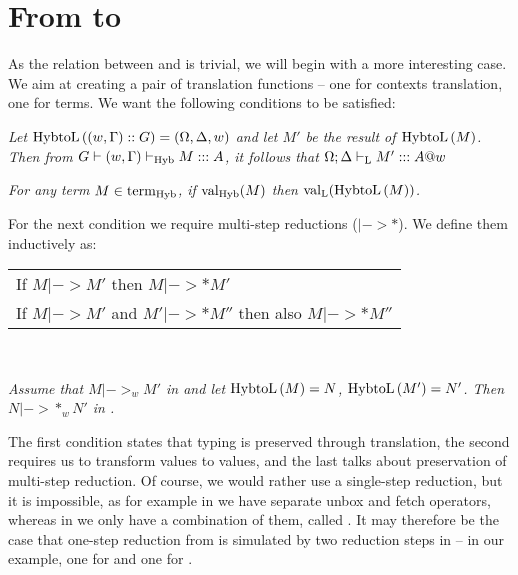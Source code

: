\section{From \langHyb{} to \langL{}}
As the relation between \langHyb{} and \langLF{} is trivial, we will begin with a more interesting case. We aim at creating a pair of translation functions \funHybtoLe{} -- one for contexts translation, one for terms. We want the following conditions to be satisfied:

\begin{introtheoremB} \em
Let $\funHybtoL{(w, \Gamma) :: G} = (\Omega, \Delta, w)$  and let $M'$ be the result of $\funHybtoL{M}$. 
Then from $G |- (w, \Gamma) |-_\tHyb{} M ::: A$, it follows that $\Omega; \Delta |-_\tL M' ::: A @ w$
\end{introtheoremB}

\begin{introtheoremB}\em
For any term $M \in \teHyb{}$, if $\val[\tHyb]{M}$ then $\val[\tL]{\funHybtoL{M}}$.
\end{introtheoremB}

For the next condition we require multi-step reductions ($|->*$). We define them inductively as:\\

\begin{tabular} { l }
If $M |-> M'$ then $M |->* M'$ \\
If $M |-> M'$ and $M' |->* M''$ then also $M |->* M''$
\end{tabular}\\

\begin{introtheoremB}\em
Assume that $M |->_w M'$ in \langHyb{} and let $\funHybtoL{M} = N$, $\funHybtoL{M'} = N'$. Then $N |->*_w N'$ in \langL{}.
\end{introtheoremB}

The first condition states that typing is preserved through \funHybtoLe{} translation, the second requires us to transform values to values, and the last talks about preservation of multi-step reduction. Of course, we would rather use a single-step reduction,  but it is impossible, as for example in \langL{} we have separate unbox and fetch operators, whereas in \langHyb{} we only have a combination of them, called \unboxfetch{}. It may therefore be the case that one-step reduction from \langHyb{} is simulated by two reduction steps in \langL{} -- in our example, one for \unboxe{} and one for \fetche{}.\\

